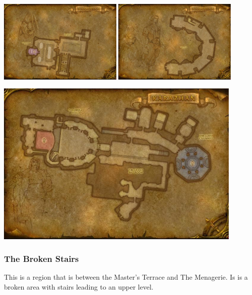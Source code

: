 \begin{center}
	\includegraphics[width=0.45\textwidth]{img/Karazhan/cropped-3457-3.jpg} \includegraphics[width=0.45\textwidth]{img/Karazhan/cropped-3457-5.jpg}
	
	\includegraphics[width=0.90\textwidth]{img/Karazhan/cropped-3457-4.jpg}
\end{center}

\subsubsection{The Broken Stairs}

This is a region that is between the Master's Terrace and The Menagerie. Is is a broken area with stairs leading to an upper level.

